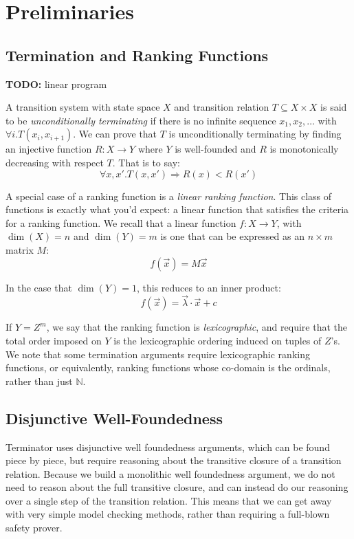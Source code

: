 \documentclass[preprint]{sigplanconf}
\theoremstyle{definition}
\newcommand{\todo}[1]{{\bf TODO:} #1}
\begin{document}
\section{Preliminaries}
\subsection{Termination and Ranking Functions} \label{sec:ranking.functions}
\todo{linear program}

A transition system with state space $X$ and transition relation $T \subseteq X \times X$
is said to be \emph{unconditionally terminating} if there is no infinite sequence
$x_1, x_2, \ldots$ with $\forall i . T(x_i, x_{i+1})$.  We can prove that $T$ is
unconditionally terminating by finding an injective function $R: X \to Y$ where
$Y$ is well-founded and $R$ is monotonically decreasing with respect $T$.  That is
to say:
$$\forall x, x' . T(x, x') \Rightarrow R(x) < R(x')$$

A special case of a ranking function is a \emph{linear ranking function}.  This
class of functions is exactly what you'd expect: a linear function that satisfies
the criteria for a ranking function.  We recall that a linear function $f: X \to Y$,
with $\dim(X) = n$ and $\dim(Y) = m$
is one that can be expressed as an $n \times m$ matrix $M$:
$$f(\vec{x}) = M\vec{x}$$

In the case that $\dim(Y) = 1$, this reduces to an inner product:
$$f(\vec{x}) = \vec{\lambda} \cdotp \vec{x} + c$$

If $Y = Z^m$, we say that the ranking function is \emph{lexicographic},
and require that the total order imposed on $Y$ is the lexicographic ordering
induced on tuples of $Z$'s.  We note that some termination arguments
require lexicographic ranking functions, or equivalently, ranking functions
whose co-domain is the ordinals, rather than just $\mathbb{N}$.

\subsection{Disjunctive Well-Foundedness}
Terminator uses disjunctive well foundedness arguments, which can be found
piece by piece, but require reasoning about the transitive closure of a transition
relation.  Because we build a monolithic well foundedness argument, we
do not need to reason about the full transitive closure, and can instead do our
reasoning over a single step of the transition relation.  This means that we
can get away with very simple model checking methods, rather than requiring
a full-blown safety prover.
\end{document}
